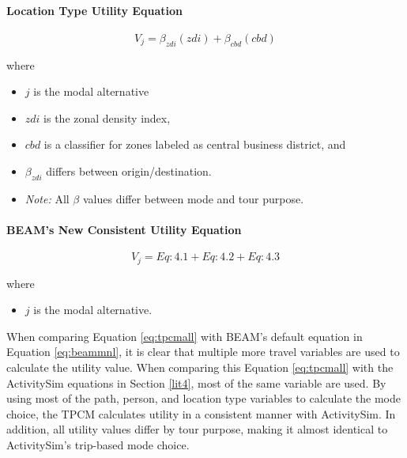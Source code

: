 \documentclass[3p, authoryear, review]{elsarticle} %
\providecommand{\tightlist}{%
  \setlength{\itemsep}{0pt}\setlength{\parskip}{0pt}}
\begin{document}
\hypertarget{location-type-utility-equation}{%
\paragraph{Location Type Utility Equation}\label{location-type-utility-equation}}

\begin{equation}
  V_j = \beta_{zdi}(zdi) + \beta_{cbd}(cbd) \label{eq:tpcmloc}
\end{equation}

where

\begin{itemize}
\tightlist
\item
  \(j\) is the modal alternative
\item
  \(zdi\) is the zonal density index,
\item
  \(cbd\) is a classifier for zones labeled as central business district, and
\item
  \(\beta_{zdi}\) differs between origin/destination.
\item
  \emph{Note:} All \(\beta\) values differ between mode and tour purpose.
\end{itemize}

\hypertarget{beams-new-consistent-utility-equation}{%
\paragraph{BEAM's New Consistent Utility Equation}\label{beams-new-consistent-utility-equation}}

\begin{equation}  
  V_j = Eq:4.1 + Eq:4.2 + Eq:4.3 \label{eq:tpcmall}
\end{equation}

where

\begin{itemize}
\tightlist
\item
  \(j\) is the modal alternative.
\end{itemize}

When comparing Equation \eqref{eq:tpcmall} with BEAM's default equation in Equation \eqref{eq:beammnl}, it is clear that multiple more travel variables are used to calculate the utility value. When comparing this Equation \eqref{eq:tpcmall} with the ActivitySim equations in Section \ref{lit4}, most of the same variable are used. By using most of the path, person, and location type variables to calculate the mode choice, the TPCM calculates utility in a consistent manner with ActivitySim. In addition, all utility values differ by tour purpose, making it almost identical to ActivitySim's trip-based mode choice.
\end{document}
